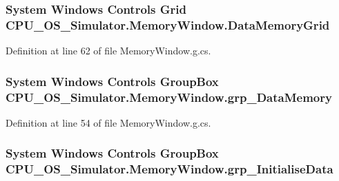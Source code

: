\subsubsection[{Data\+Memory\+Grid}]{\setlength{\rightskip}{0pt plus 5cm}System Windows Controls Grid C\+P\+U\+\_\+\+O\+S\+\_\+\+Simulator.\+Memory\+Window.\+Data\+Memory\+Grid\hspace{0.3cm}{\ttfamily [package]}}\label{class_c_p_u___o_s___simulator_1_1_memory_window_a93e699c04992f66b92f0d3b834f267d1}


Definition at line 62 of file Memory\+Window.\+g.\+cs.

\hypertarget{class_c_p_u___o_s___simulator_1_1_memory_window_a283493c20704b70efe355621cd6e5aa4}{}
\subsubsection[{grp\+\_\+\+Data\+Memory}]{\setlength{\rightskip}{0pt plus 5cm}System Windows Controls Group\+Box C\+P\+U\+\_\+\+O\+S\+\_\+\+Simulator.\+Memory\+Window.\+grp\+\_\+\+Data\+Memory\hspace{0.3cm}{\ttfamily [package]}}\label{class_c_p_u___o_s___simulator_1_1_memory_window_a283493c20704b70efe355621cd6e5aa4}


Definition at line 54 of file Memory\+Window.\+g.\+cs.

\hypertarget{class_c_p_u___o_s___simulator_1_1_memory_window_a6cfa52c953fe5704090e7e9f4ac2c9d1}{}
\subsubsection[{grp\+\_\+\+Initialise\+Data}]{\setlength{\rightskip}{0pt plus 5cm}System Windows Controls Group\+Box C\+P\+U\+\_\+\+O\+S\+\_\+\+Simulator.\+Memory\+Window.\+grp\+\_\+\+Initialise\+Data\hspace{0.3cm}{\ttfamily [package]}}\label{class_c_p_u___o_s___simulator_1_1_memory_window_a6cfa52c953fe5704090e7e9f4ac2c9d1}


